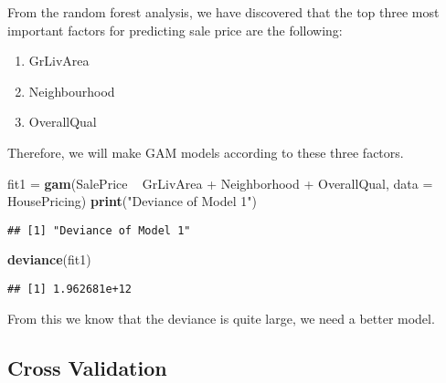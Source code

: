 \documentclass[]{article}
\newenvironment{Shaded}{\begin{snugshade}}{\end{snugshade}}
\newcommand{\KeywordTok}[1]{\textcolor[rgb]{0.13,0.29,0.53}{\textbf{{#1}}}}
\newcommand{\DataTypeTok}[1]{\textcolor[rgb]{0.13,0.29,0.53}{{#1}}}
\newcommand{\StringTok}[1]{\textcolor[rgb]{0.31,0.60,0.02}{{#1}}}
\newcommand{\NormalTok}[1]{{#1}}
\begin{document}
From the random forest analysis, we have discovered that the top three
most important factors for predicting sale price are the following:

\begin{enumerate}
\item GrLivArea
\item Neighbourhood
\item OverallQual
\end{enumerate}

Therefore, we will make GAM models according to these three factors.

\begin{Shaded}
\begin{Highlighting}[]
\NormalTok{fit1 =}\StringTok{ }\KeywordTok{gam}\NormalTok{(SalePrice ~}\StringTok{ }\NormalTok{GrLivArea +}\StringTok{ }\NormalTok{Neighborhood +}\StringTok{ }\NormalTok{OverallQual, }\DataTypeTok{data =} \NormalTok{HousePricing)}
\KeywordTok{print}\NormalTok{(}\StringTok{"Deviance of Model 1"}\NormalTok{)}
\end{Highlighting}
\end{Shaded}

\begin{verbatim}
## [1] "Deviance of Model 1"
\end{verbatim}

\begin{Shaded}
\begin{Highlighting}[]
\KeywordTok{deviance}\NormalTok{(fit1)}
\end{Highlighting}
\end{Shaded}

\begin{verbatim}
## [1] 1.962681e+12
\end{verbatim}

From this we know that the deviance is quite large, we need a better
model.

\subsection{Cross Validation}\label{cross-validation}
\end{document}
